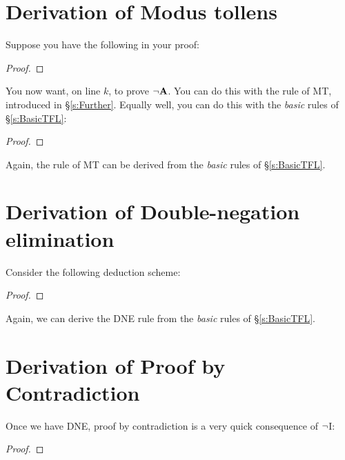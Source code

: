 \section{Derivation of Modus tollens}
Suppose you have the following in your proof:
\begin{proof}
\end{proof}
You now want, on line $k$, to prove $\neg \mathbf{A}$. You can do this with the rule of MT, introduced in \S\ref{s:Further}. Equally well, you can do this with the \emph{basic} rules of \S\ref{s:BasicTFL}:
\begin{proof}
		\open
		\close
\end{proof}
Again, the rule of MT can be derived from the \emph{basic} rules of \S\ref{s:BasicTFL}.

\section{Derivation of Double-negation elimination}
Consider the following deduction scheme:
	\begin{proof}
	\LEM
	\open
	\close
	\open
	\close
\end{proof}
Again,  we can derive the DNE rule from the \emph{basic} rules of \S\ref{s:BasicTFL}.

\section{Derivation of Proof by Contradiction}
Once we have DNE, proof by contradiction is a very quick consequence of $\neg$I:
\begin{proof}
\open
{}
\close
{}
\end{proof}

